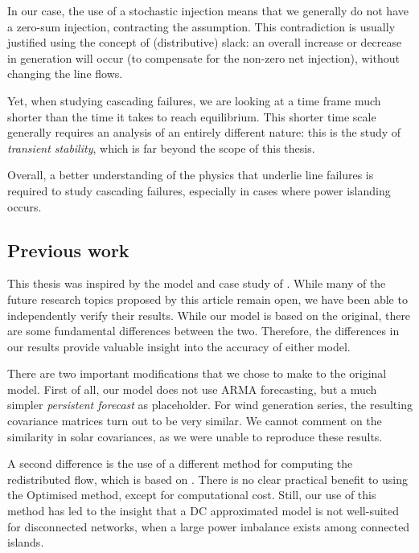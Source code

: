 \documentclass[main.tex]{subfiles}
\begin{document}
In our case, the use of a stochastic injection means that we generally do not have a zero-sum injection, contracting the assumption. This contradiction is usually justified using the concept of (distributive) slack: an overall increase or decrease in generation will occur (to compensate for the non-zero net injection), without changing the line flows.

Yet, when studying cascading failures, we are looking at a time frame much shorter than the time it takes to reach equilibrium. 
This shorter time scale generally requires an analysis of an entirely different nature: this is the study of \emph{transient stability}, which is far beyond the scope of this thesis. 

Overall, a better understanding of the physics that underlie line failures is required to study cascading failures, especially in cases where power islanding occurs. 

\subsection{Previous work \citep{Nesti2018emergentfailures}}\label{sec:discussionnesti}
This thesis was inspired by the model and case study of \cite{Nesti2018emergentfailures}. While many of the future research topics proposed by this article remain open, we have been able to independently verify their results. While our model is based on the original, there are some fundamental differences between the two. Therefore, the differences in our results provide valuable insight into the accuracy of either model. 

There are two important modifications that we chose to make to the original model. First of all, our model does not use ARMA forecasting, but a much simpler \emph{persistent forecast} as placeholder. For wind generation series, the resulting covariance matrices turn out to be very similar. We cannot comment on the similarity in solar covariances, as we were unable to reproduce these results.

A second difference is the use of a different method for computing the redistributed flow, which is based on \cite{Ronellenfitsch2017}. There is no clear practical benefit to using the Optimised method, except for computational cost. Still, our use of this method has led to the insight that a DC approximated model is not well-suited for disconnected networks, when a large power imbalance exists among connected islands. 
\end{document}
